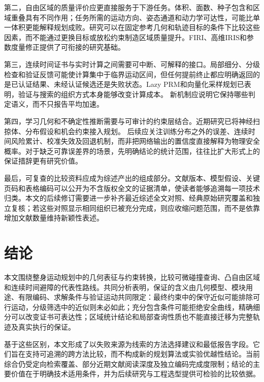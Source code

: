 \documentclass{aas}
\begin{document}
第二，自由区域的质量评价应更直接服务于下游任务。体积、面数、种子包含和区域重叠具有不同作用；任务所需的运动方向、姿态通道和动力学可达性，可能比单一体积更能解释规划成败。研究可以在固定参考几何和轨迹目标的条件下比较这些因素，而不能通过更换目标或放松约束制造区域质量提升。FIRI、高维IRIS和参数度量修正提供了可衔接的研究基础。\cite{R02}\cite{R15}\cite{R21}

第三，连续时间证书与实时计算之间需要可中断、可解释的接口。局部细分、分级检查和验证反馈可能使计算集中于临界运动区间，但任何提前终止都应明确返回的是已认证结果、未经认证候选还是失败状态。Lazy PRM和向量化采样规划已表明，验证与搜索的组织方式本身能够改变计算成本。\cite{R28}\cite{R29} 新机制应说明它保持哪些判定语义，而不只报告平均加速。

第四，学习几何和不确定性推断需要与可审计的约束层结合。近期研究已将神经扫掠体、分布假设和机会约束接入规划。\cite{R17}\cite{R18} 后续应关注训练分布之外的误差、连续时间风险累计、校准失效及回退机制，而非把网络输出的置信度直接解释为物理安全概率。对于缺乏可靠误差界的场景，先明确结论的统计范围，往往比扩大形式上的保证措辞更有研究价值。

最后，可复查的比较资料应成为综述产出的组成部分。文献版本、模型假设、关键页码和表格编码可以公开为不含版权全文的证据清单，使读者能够追溯每一项技术归类。本文的后续修订需要进一步补齐最近综述全文对照、经典原始研究覆盖和独立复核；若这些对照显示相同组织已被充分完成，则应收缩问题范围，而不是依靠增加文献数量维持新颖性表述。

\section{结论}
本文围绕整身运动规划中的几何表征与约束转换，比较可微碰撞查询、凸自由区域和连续时间避障的代表性路线。共同分析表明，保证的含义由几何模型、模块用途、有限编码、求解条件与验证运动共同限定：最终约束中的保守近似可能排除可行运动，分级筛选中的近似则未必如此；充分包含条件可能拒绝安全曲线，精确细分可以改变证书可表达性；区域统计结论和局部查询性质也不能直接迁移为完整轨迹及真实执行的保证。

基于这些区别，本文形成了以失败来源为线索的方法选择建议和最低报告字段。它们旨在支持可追溯的跨方法比较，而不构成新的规划算法或实验优越性结论。当前综合仍受定向检索覆盖、部分近期文献阅读深度及独立编码完成度限制；结论的主要价值在于明确技术适用条件，并为后续研究与工程选型提供可检验的比较依据。
\end{document}
